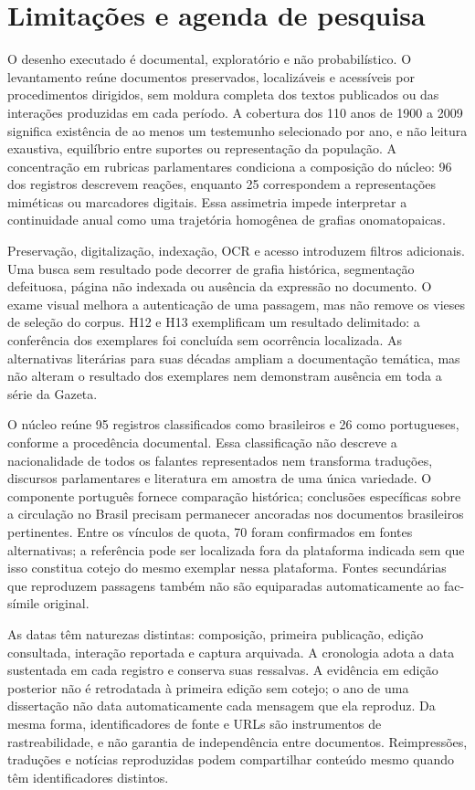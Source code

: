 \section{Limitações e agenda de pesquisa}

O desenho executado é documental, exploratório e não probabilístico. O levantamento reúne documentos preservados, localizáveis e acessíveis por procedimentos dirigidos, sem moldura completa dos textos publicados ou das interações produzidas em cada período. A cobertura dos 110 anos de 1900 a 2009 significa existência de ao menos um testemunho selecionado por ano, e não leitura exaustiva, equilíbrio entre suportes ou representação da população. A concentração em rubricas parlamentares condiciona a composição do núcleo: 96 dos \CorpusSize{} registros descrevem reações, enquanto 25 correspondem a representações miméticas ou marcadores digitais. Essa assimetria impede interpretar a continuidade anual como uma trajetória homogênea de grafias onomatopaicas.

Preservação, digitalização, indexação, OCR e acesso introduzem filtros adicionais. Uma busca sem resultado pode decorrer de grafia histórica, segmentação defeituosa, página não indexada ou ausência da expressão no documento. O exame visual melhora a autenticação de uma passagem, mas não remove os vieses de seleção do corpus. H12 e H13 exemplificam um resultado delimitado: a conferência dos exemplares foi concluída sem ocorrência localizada. As alternativas literárias para suas décadas ampliam a documentação temática, mas não alteram o resultado dos exemplares nem demonstram ausência em toda a série da Gazeta.

O núcleo reúne 95 registros classificados como brasileiros e 26 como portugueses, conforme a procedência documental. Essa classificação não descreve a nacionalidade de todos os falantes representados nem transforma traduções, discursos parlamentares e literatura em amostra de uma única variedade. O componente português fornece comparação histórica; conclusões específicas sobre a circulação no Brasil precisam permanecer ancoradas nos documentos brasileiros pertinentes. Entre os \ArchiveLinkCount{} vínculos de quota, 70 foram confirmados em fontes alternativas; a referência pode ser localizada fora da plataforma indicada sem que isso constitua cotejo do mesmo exemplar nessa plataforma. Fontes secundárias que reproduzem passagens também não são equiparadas automaticamente ao fac-símile original.

As datas têm naturezas distintas: composição, primeira publicação, edição consultada, interação reportada e captura arquivada. A cronologia adota a data sustentada em cada registro e conserva suas ressalvas. A evidência em edição posterior não é retrodatada à primeira edição sem cotejo; o ano de uma dissertação não data automaticamente cada mensagem que ela reproduz. Da mesma forma, identificadores de fonte e URLs são instrumentos de rastreabilidade, e não garantia de independência entre documentos. Reimpressões, traduções e notícias reproduzidas podem compartilhar conteúdo mesmo quando têm identificadores distintos.

